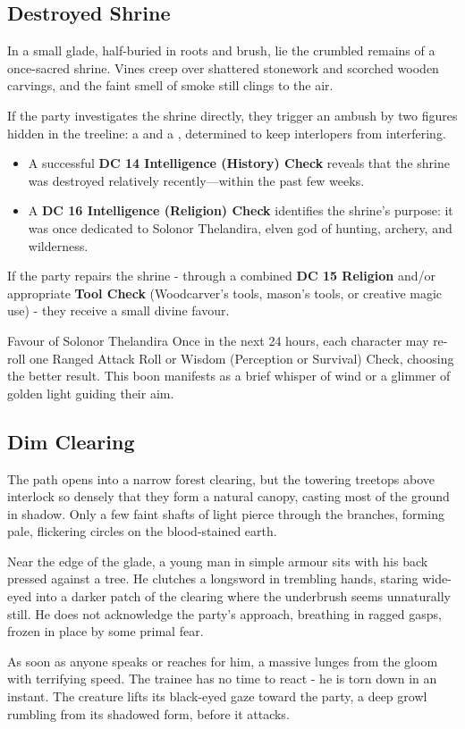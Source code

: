\subsection*{ Destroyed Shrine}
{\entryfont In a small glade, half-buried in roots and brush, lie the crumbled remains of a once-sacred shrine. Vines creep over shattered stonework and scorched wooden carvings, and the faint smell of smoke still clings to the air.

If the party investigates the shrine directly, they trigger an ambush by two figures hidden in the treeline: a \hyperref[monster:BanditArcher]{} and a \hyperref[monster:BanditDruid]{}, determined to keep interlopers from interfering.
\begin{itemize}
	\item A successful \textbf{DC 14 Intelligence (History) Check} reveals that the shrine was destroyed relatively recently—within the past few weeks.
	\item A \textbf{DC 16 Intelligence (Religion) Check} identifies the shrine's purpose: it was once dedicated to Solonor Thelandira, elven god of hunting, archery, and wilderness.
\end{itemize}
If the party repairs the shrine - through a combined \textbf{DC 15 Religion} and/or appropriate \textbf{Tool Check} (Woodcarver's tools, mason's tools, or creative magic use) - they receive a small divine favour.}
\begingroup
	\DndSetThemeColor[PhbMauve]
	\begin{DndComment}{Favour of Solonor Thelandira}
		Once in the next 24 hours, each character may re-roll one Ranged Attack Roll or Wisdom (Perception or Survival) Check, choosing the better result. This boon manifests as a brief whisper of wind or a glimmer of golden light guiding their aim.
	\end{DndComment}
\endgroup
\subsection*{ Dim Clearing}
{\entryfont The path opens into a narrow forest clearing, but the towering treetops above interlock so densely that they form a natural canopy, casting most of the ground in shadow. Only a few faint shafts of light pierce through the branches, forming pale, flickering circles on the blood-stained earth.

Near the edge of the glade, a young man in simple armour sits with his back pressed against a tree. He clutches a longsword in trembling hands, staring wide-eyed into a darker patch of the clearing where the underbrush seems unnaturally still. He does not acknowledge the party's approach, breathing in ragged gasps, frozen in place by some primal fear.

As soon as anyone speaks or reaches for him, a massive \hyperref[monster:ShadowMastiff]{} lunges from the gloom with terrifying speed. The trainee has no time to react - he is torn down in an instant. The creature lifts its black-eyed gaze toward the party, a deep growl rumbling from its shadowed form, before it attacks.}
